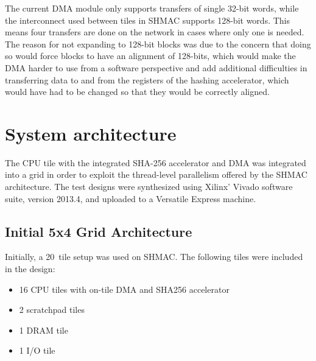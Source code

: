 The current DMA module only supports transfers of single 32-bit words, while the interconnect used between tiles in SHMAC supports 128-bit words.
This means four transfers are done on the network in cases where only one is needed. 
The reason for not expanding to 128-bit blocks was due to the concern that doing so would force blocks to have an alignment of 128-bits, which would make the DMA harder to use from a software perspective and add additional difficulties in transferring data to and from the registers of the hashing accelerator, which would have had to be changed so that they would be correctly aligned.

\section{System architecture}
\label{sec:SHMAC_sys_arch}

The CPU tile with the integrated SHA-256 accelerator and DMA was integrated into a grid in order
to exploit the thread-level parallelism offered by the SHMAC architecture.
The test designs were synthesized using Xilinx' Vivado software suite, version 2013.4, and
uploaded to a Versatile Express machine.

\subsection{Initial 5x4 Grid Architecture}
Initially, a 20~tile setup was used on SHMAC. The following tiles were included in the design:

\begin{itemize}
    \item 16 CPU tiles with on-tile DMA and SHA256 accelerator
    \item 2 scratchpad tiles
    \item 1 DRAM tile
    \item 1 I/O tile
\end{itemize}

